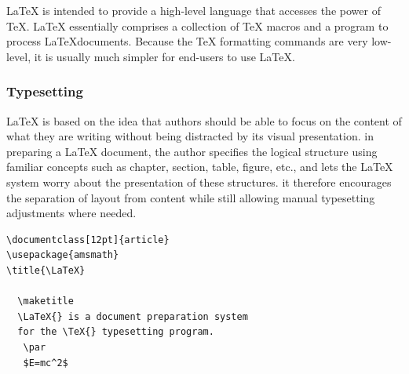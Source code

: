 \noindent\LaTeX{} is intended to provide a high-level language that
accesses the power of \TeX. \LaTeX{} essentially comprises a
collection of \TeX{} macros and a program to process \LaTeX documents. 
Because the \TeX{} formatting commands are very low-level, it is usually 
much simpler for end-users to use \LaTeX{}.


\subsubsection{Typesetting}
\LaTeX{} is based on the idea that authors should be able to focus on 
the content of what they are writing without being distracted by its 
visual presentation. in preparing a \LaTeX{} document, the author 
specifies the logical structure using familiar concepts such as 
chapter, section, table, figure, etc., and lets the \LaTeX{} system 
worry about the presentation of these structures. it therefore 
encourages the separation of layout from content while still allowing 
manual typesetting adjustments where needed. 

\begin{verbatim}
\documentclass[12pt]{article}
\usepackage{amsmath}
\title{\LaTeX}

  \maketitle 
  \LaTeX{} is a document preparation system 
  for the \TeX{} typesetting program.
   \par 
   $E=mc^2$

\end{verbatim}

